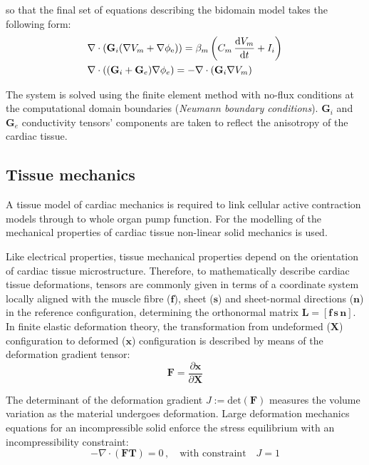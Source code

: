 \noindent
so that the final set of equations describing the bidomain model takes the following form:
%
\begin{align}\label{eq:bidomainmodel}
    & \nabla\cdot(\mathbf{G}_i(\nabla V_m + \nabla \phi_{\text{e}})) = \beta_m\left(C_m\,\dfrac{\mathrm{d}{V_m}}{\mathrm{d}{t}} + I_i\right) \\
    & \nabla\cdot((\mathbf{G}_i + \mathbf{G}_e)\nabla \phi_e) = -\nabla\cdot(\mathbf{G}_i\nabla V_m)
\end{align}

\noindent
The system is solved using the finite element method with no-flux conditions at the computational domain boundaries (\textit{Neumann boundary conditions}). $\mathbf{G}_i$ and $\mathbf{G}_e$ conductivity tensors' components are taken to reflect the anisotropy of the cardiac tissue.


%
%
%
\subsection{Tissue mechanics}\label{sec:tissue_mech_math_modelling}
A tissue model of cardiac mechanics is required to link cellular active contraction models through to whole organ pump function. For the modelling of the mechanical properties of cardiac tissue non-linear solid mechanics is used.

\vspace{0.2cm}
Like electrical properties, tissue mechanical properties depend on the orientation of cardiac tissue microstructure. Therefore, to mathematically describe cardiac tissue deformations, tensors are commonly given in terms of a coordinate system locally aligned with the muscle fibre ($\mathbf{f}$), sheet ($\mathbf{s}$) and sheet-normal directions ($\mathbf{n}$) in the reference configuration, determining the orthonormal matrix $\mathbf{L} = [\mathbf{f}\,\mathbf{s}\,\mathbf{n}]$. In finite elastic deformation theory, the transformation from undeformed ($\mathbf{X}$) configuration to deformed ($\mathbf{x}$) configuration is described by means of the deformation gradient tensor:
%
\begin{equation}
    \mathbf{F} = \frac{\partial \mathbf{x}}{\partial\mathbf{X}}
\end{equation}

\noindent
The determinant of the deformation gradient $J:=\text{det}(\mathbf{F})$ measures the volume variation as the material undergoes deformation. Large deformation mechanics equations for an incompressible solid enforce the stress equilibrium with an incompressibility constraint:
%
\begin{equation}
    -\nabla\cdot(\mathbf{F}\mathbf{T}) = 0\,,\quad\text{with constraint}\quad J = 1
\end{equation}

